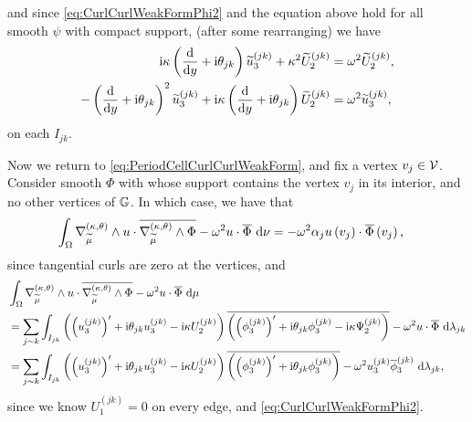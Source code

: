 and since \eqref{eq:CurlCurlWeakFormPhi2} and the equation above hold for all smooth $\psi$ with compact support, (after some rearranging) we have
\begin{subequations} \label{eq:QGPhiStandalone}
	\begin{align}
		\mathrm{i}\kappa \left(  \dfrac{\mathrm{d}}{\mathrm{d}y} + \mathrm{i}\theta_{jk}  \right)\widetilde{u}_3^{(jk)} + \kappa^2\widetilde{U}_2^{(jk)} &= \omega^2\widetilde{U}_2^{(jk)}, \label{eq:QGPhi2Standalone} \\
		-\left(  \dfrac{\mathrm{d}}{\mathrm{d}y} + \mathrm{i}\theta_{jk}  \right)^2\widetilde{u}_3^{(jk)} + \mathrm{i}\kappa\left(  \dfrac{\mathrm{d}}{\mathrm{d}y} + \mathrm{i}\theta_{jk}  \right)\widetilde{U}_2^{(jk)} &= \omega^2 \widetilde{u}_3^{(jk)}, \label{eq:QGPhi3Standalone}
	\end{align}
\end{subequations}
on each $I_{jk}$.

Now we return to \eqref{eq:PeriodCellCurlCurlWeakForm}, and fix a vertex $v_j\in\mathcal{V}$.
Consider smooth $\Phi$ with whose support contains the vertex $v_j$ in its interior, and no other vertices of $\mathbb{G}$.
In which case, we have that
\begin{align*}
	\int_{\Omega} \nabla_{\widetilde{\mu}}^{\left( \kappa, \theta \right)}\wedge u\cdot\overline{\nabla_{\widetilde{\mu}}^{\left( \kappa, \theta \right)}\wedge\Phi} - \omega^2 u\cdot\overline{\Phi}  \ \mathrm{d}\nu
	&= - \omega^2 \alpha_j u\left( v_j \right)\cdot\overline{\Phi}\left( v_j \right),
\end{align*}
since tangential curls are zero at the vertices, and
\begin{align*}
	& \int_{\Omega} \nabla_{\widetilde{\mu}}^{\left( \kappa, \theta \right)}\wedge u\cdot\overline{\nabla_{\widetilde{\mu}}^{\left( \kappa, \theta \right)}\wedge\Phi} - \omega^2 u\cdot\overline{\Phi}  \ \mathrm{d}\mu \\
	&= \sum_{j\sim k}\int_{I_{jk}} \left(  \left( u_3^{(jk)} \right)' + \mathrm{i}\theta_{jk} u_3^{(jk)} - \mathrm{i}\kappa U_2^{(jk)}  \right)\overline{\left(  \left( \phi_3^{(jk)} \right)' + \mathrm{i}\theta_{jk} \phi_3^{(jk)} - \mathrm{i}\kappa \Psi_2^{(jk)}  \right)} - \omega^2 u\cdot\overline{\Phi}  \ \mathrm{d}\lambda_{jk} \\
	&= \sum_{j\sim k}\int_{I_{jk}} \left(  \left( u_3^{(jk)} \right)' + \mathrm{i}\theta_{jk} u_3^{(jk)} - \mathrm{i}\kappa U_2^{(jk)}  \right)\overline{\left(  \left( \phi_3^{(jk)} \right)' + \mathrm{i}\theta_{jk} \phi_3^{(jk)}  \right)} - \omega^2 u_3^{(jk)}\overline{\phi}_3^{(jk)}  \ \mathrm{d}\lambda_{jk},
\end{align*}
since we know $U_1^{(jk)}=0$ on every edge, and \eqref{eq:CurlCurlWeakFormPhi2}.

